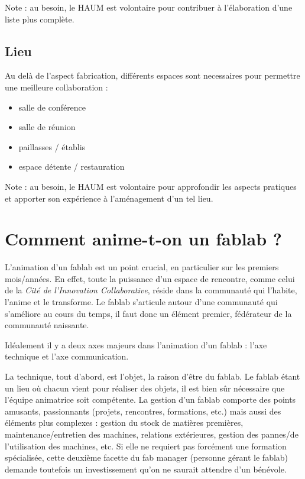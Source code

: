 \documentclass[a4paper,10pt]{scrartcl}
\begin{document}
Note : au besoin, le HAUM est volontaire pour contribuer à l'élaboration d'une liste plus complète.

\subsection*{Lieu}

Au delà de l'aspect fabrication, différents espaces sont necessaires pour permettre une meilleure collaboration :
\begin{itemize}
 \item salle de conférence
 \item salle de réunion
 \item paillasses / établis
 \item espace détente / restauration
\end{itemize}

Note : au besoin, le HAUM est volontaire pour approfondir les aspects pratiques et apporter son expérience à l'aménagement d'un tel lieu.

\section{Comment anime-t-on un fablab ?}
L'animation d'un fablab est un point crucial, en particulier sur les premiers mois/années. En effet, toute la puissance d'un espace de rencontre, comme celui de la \emph{Cité de l'Innovation Collaborative}, réside dans la communauté qui l'habite, l'anime et le transforme.
Le fablab s'articule autour d'une communauté qui s'améliore au cours du temps, il faut donc un élément premier, fédérateur de la communauté naissante.

Idéalement il y a deux axes majeurs dans l'animation d'un fablab : l'axe technique et l'axe communication.

La technique, tout d'abord, est l'objet, la raison d'être du fablab. Le fablab étant un lieu où chacun vient pour réaliser des objets, il est bien sûr nécessaire que l'équipe animatrice soit compétente.
La gestion d'un fablab comporte des points amusants, passionnants (projets, rencontres, formations, etc.) mais aussi des éléments plus complexes : gestion du stock de matières premières, maintenance/entretien des machines, relations extérieures, gestion des pannes/de l'utilisation des machines, etc.
Si elle ne requiert pas forcément une formation spécialisée, cette deuxième facette du fab manager (personne gérant le fablab) demande toutefois un investissement qu'on ne saurait attendre d'un bénévole.
\end{document}
